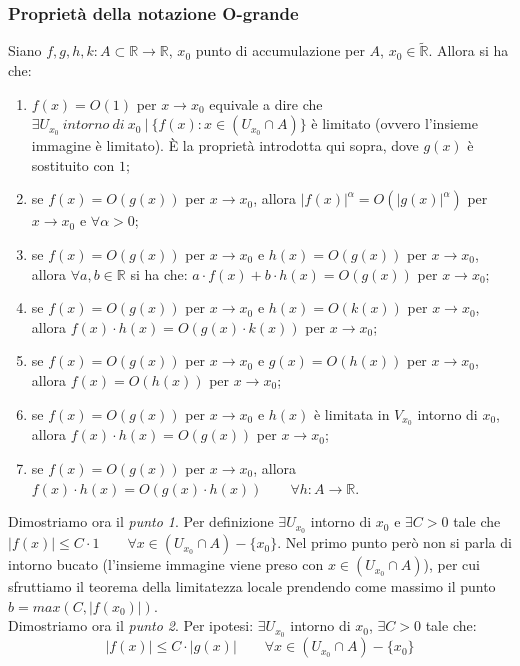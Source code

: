 \documentclass{article}
\begin{document}
\subsubsection{Proprietà della notazione O-grande}
Siano $f, g, h, k: A \subset \mathbb{R} \xrightarrow{} \mathbb{R}$, $x_0$ punto di accumulazione per $A$, $x_0 \in \widetilde{\mathbb{R}}$. Allora si ha che:
\begin{enumerate}
    \item $f(x) = O(1)$ per $x \to x_0$ equivale a dire che $\exists U_{x_0} \ intorno \ di \ x_0 \ | \ \{f(x) : x \in (U_{x_0} \cap A)\}$ è limitato (ovvero l'insieme immagine è limitato). È la proprietà introdotta qui sopra, dove $g(x)$ è sostituito con $1$;
    \item se $f(x) = O(g(x))$ per $x \to x_0$, allora $|f(x)|^\alpha = O(|g(x)|^\alpha)$ per $x \to x_0$ e $\forall \alpha > 0$;
    \item se $f(x) = O(g(x))$ per $x \to x_0$ e $h(x) = O(g(x))$ per $x \to x_0$, allora $\forall a, b \in \mathbb{R}$ si ha che: $a \cdot f(x) + b \cdot h(x) = O(g(x))$ per $x \to x_0$;
    \item se $f(x) = O(g(x))$ per $x \to x_0$ e $h(x) = O(k(x))$ per $x \to x_0$, allora $f(x) \cdot h(x) = O(g(x) \cdot k(x))$ per $x \to x_0$;
    \item se $f(x) = O(g(x))$ per $x \to x_0$ e $g(x) = O(h(x))$ per $x \to x_0$, allora $f(x) = O(h(x))$ per $x \to x_0$;
    \item se $f(x) = O(g(x))$ per $x \to x_0$ e $h(x)$ è limitata in $V_{x_0}$ intorno di $x_0$, allora $f(x) \cdot h(x) = O(g(x))$ per $x \to x_0$;
    \item se $f(x) = O(g(x))$ per $x \to x_0$, allora $f(x) \cdot h(x) = O(g(x) \cdot h(x)) \qquad \forall h: A \xrightarrow{} \mathbb{R}$.
\end{enumerate}

\noindent Dimostriamo ora il \textit{punto 1}. Per definizione $\exists U_{x_0}$ intorno di $x_0$ e $\exists C > 0$ tale che $|f(x)| \leq C \cdot 1 \qquad \forall x \in (U_{x_0} \cap A) - \{x_0\}$. Nel primo punto però non si parla di intorno bucato (l'insieme immagine viene preso con $x \in (U_{x_0} \cap A)$), per cui sfruttiamo il teorema della limitatezza locale prendendo come massimo il punto $b = max(C, |f(x_0)|)$.\\
Dimostriamo ora il \textit{punto 2}. Per ipotesi: $\exists U_{x_0}$ intorno di $x_0$, $\exists C > 0$ tale che:
\begin{equation*}
    |f(x)| \leq C \cdot |g(x)| \qquad \forall x \in (U_{x_0} \cap A) - \{x_0\}
\end{equation*}
\end{document}
